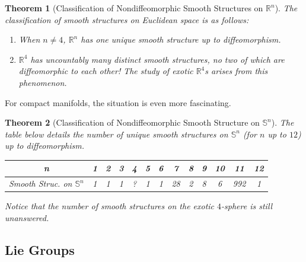 \documentclass{article}
\newtheorem{theorem}{Theorem}[section]
\theoremstyle{remark}
\theoremstyle{definition}
\begin{document}
      \begin{theorem}[Classification of Nondiffeomorphic Smooth Structures on $\mathbb{R}^n$]
        The classification of smooth structures on Euclidean space is as follows: 
        \begin{enumerate}
          \item When $n \neq 4$, $\mathbb{R}^n$ has one unique smooth structure up to diffeomorphism.
          \item $\mathbb{R}^4$ has uncountably many distinct smooth structures, no two of which are diffeomorphic to each other! The study of \textit{exotic $\mathbb{R}^4$}s arises from this phenomenon. 
        \end{enumerate}
      \end{theorem}

      For compact manifolds, the situation is even more fascinating.

      \begin{theorem}[Classification of Nondiffeomorphic Smooth Structure on $\mathbb{S}^n$]
        The table below details the number of unique smooth structures on $\mathbb{S}^n$ (for $n$ up to $12$) up to diffeomorphism. 

        \begin{center}
        \begin{tabular}{c|c|c|c|c|c|c|c|c|c|c|c|c}
          n & 1 & 2&3&4&5&6&7&8&9&10&11&12 \\
          \hline
          Smooth Struc. on $\mathbb{S}^n$ & 1&1&1&?&1&1&28&2&8&6&992&1
        \end{tabular}
        \end{center}

        Notice that the number of smooth structures on the exotic $4$-sphere is still unanswered. 
      \end{theorem}

  \subsection{Lie Groups}
\end{document}
